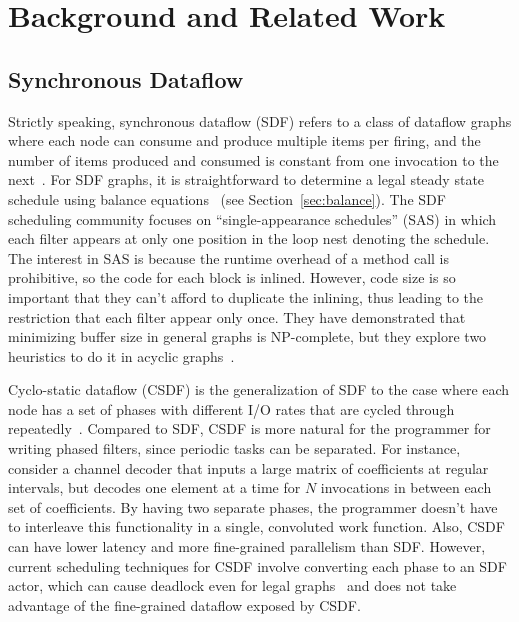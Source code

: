 \section{Background and Related Work}
\label{sec:related}

\subsection{Synchronous Dataflow}

Strictly speaking, synchronous dataflow (SDF) refers to a class of
dataflow graphs where each node can consume and produce multiple items
per firing, and the number of items produced and consumed is constant
from one invocation to the next~\cite{LM87-i,LM87-ii}.  For SDF
graphs, it is straightforward to determine a legal steady state
schedule using balance equations~\cite{leesdf} (see
Section~\ref{sec:balance}).  The SDF scheduling community focuses on
``single-appearance schedules'' (SAS) in which each filter appears at
only one position in the loop nest denoting the schedule.  The
interest in SAS is because the runtime overhead of a method call is
prohibitive, so the code for each block is inlined.  However, code
size is so important that they can't afford to duplicate the inlining,
thus leading to the restriction that each filter appear only once.
They have demonstrated that minimizing buffer size in general graphs
is NP-complete, but they explore two heuristics to do it in acyclic
graphs~\cite{Bhatta97}.

Cyclo-static dataflow (CSDF) is the generalization of SDF to the case
where each node has a set of phases with different I/O rates that are
cycled through repeatedly~\cite{BELP96,Parks95}.  Compared to SDF,
CSDF is more natural for the programmer for writing phased filters,
since periodic tasks can be separated.  For instance, consider a
channel decoder that inputs a large matrix of coefficients at regular
intervals, but decodes one element at a time for $N$ invocations in
between each set of coefficients.  By having two separate phases, the
programmer doesn't have to interleave this functionality in a single,
convoluted work function.  Also, CSDF can have lower latency and more
fine-grained parallelism than SDF.  However, current scheduling
techniques for CSDF involve converting each phase to an SDF actor,
which can cause deadlock even for legal graphs~\cite{BELP96} and does
not take advantage of the fine-grained dataflow exposed by CSDF.


